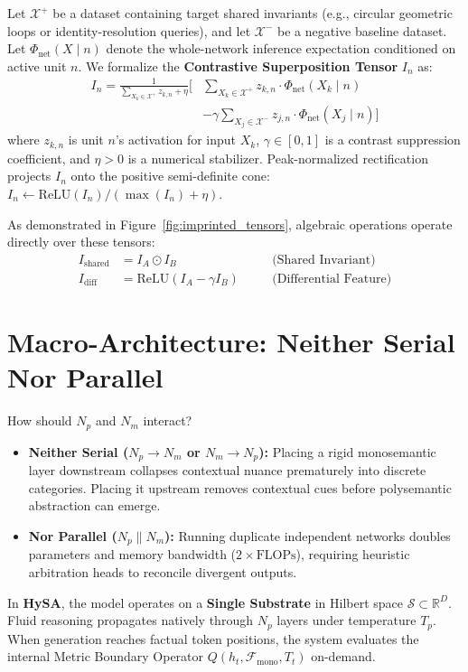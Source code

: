\documentclass[10pt,twocolumn]{article}
\theoremstyle{definition}
\begin{document}
Let $\mathcal{X}^+$ be a dataset containing target shared invariants (e.g., circular geometric loops or identity-resolution queries), and let $\mathcal{X}^-$ be a negative baseline dataset. Let $\Phi_{\mathrm{net}}(X \mid n)$ denote the whole-network inference expectation conditioned on active unit $n$. We formalize the \textbf{Contrastive Superposition Tensor} $I_n$ as:
\begin{equation}
\begin{aligned}
    I_n = \frac{1}{\sum_{X_k \in \mathcal{X}^+} z_{k,n} + \eta} \Bigg[ & \sum_{X_k \in \mathcal{X}^+} z_{k,n} \cdot \Phi_{\mathrm{net}}(X_k \mid n) \\
    & - \gamma \sum_{X_j \in \mathcal{X}^-} z_{j,n} \cdot \Phi_{\mathrm{net}}(X_j \mid n) \Bigg]
\end{aligned}
\label{eq:imprinted_tensor}
\end{equation}
where $z_{k,n}$ is unit $n$'s activation for input $X_k$, $\gamma \in [0, 1]$ is a contrast suppression coefficient, and $\eta > 0$ is a numerical stabilizer. Peak-normalized rectification projects $I_n$ onto the positive semi-definite cone: $I_n \leftarrow \mathrm{ReLU}(I_n) / (\max(I_n) + \eta)$.

As demonstrated in Figure~\ref{fig:imprinted_tensors}, algebraic operations operate directly over these tensors:
\begin{align}
    I_{\mathrm{shared}} &= I_A \odot I_B \quad &&\text{(Shared Invariant)} \\
    I_{\mathrm{diff}} &= \mathrm{ReLU}(I_A - \gamma I_B) \quad &&\text{(Differential Feature)}
\end{align}

\section{Macro-Architecture: Neither Serial Nor Parallel}
How should $N_p$ and $N_m$ interact?
\begin{itemize}[leftmargin=*, itemsep=1.5pt, topsep=2pt]
    \item \textbf{Neither Serial ($N_p \to N_m$ or $N_m \to N_p$):} Placing a rigid monosemantic layer downstream collapses contextual nuance prematurely into discrete categories. Placing it upstream removes contextual cues before polysemantic abstraction can emerge.
    \item \textbf{Nor Parallel ($N_p \parallel N_m$):} Running duplicate independent networks doubles parameters and memory bandwidth ($2\times \mathrm{FLOPs}$), requiring heuristic arbitration heads to reconcile divergent outputs.
\end{itemize}
In \textbf{HySA}, the model operates on a \textbf{Single Substrate} in Hilbert space $\mathcal{S} \subset \mathbb{R}^D$. Fluid reasoning propagates natively through $N_p$ layers under temperature $T_p$. When generation reaches factual token positions, the system evaluates the internal Metric Boundary Operator $Q(h_t, \mathcal{F}_{\mathrm{mono}}, T_t)$ on-demand.
\end{document}
